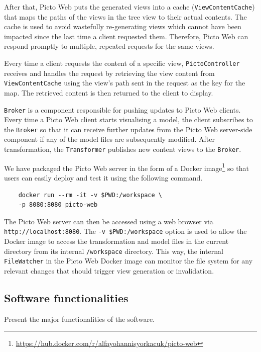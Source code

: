 \documentclass[preprint,12pt, a4paper]{elsarticle}
\begin{document}
After that, Picto Web puts the generated views into a cache (\texttt{ViewContentCache}) that maps the paths of the views in the tree view to their actual contents. The cache is used to avoid wastefully re-generating views which cannot have been impacted since the last time a client requested them. Therefore, Picto Web can respond promptly to multiple, repeated requests for the same views. 

Every time a client requests the content of a specific view, \texttt{Picto\-Control\-ler} receives and handles the request by retrieving the view content from \texttt{ViewContentCache} using the view's path sent in the request as the key for the map. The retrieved content is then returned to the client to display.

\texttt{Broker} is a component responsible for pushing updates to Picto Web clients. Every time a Picto Web client starts visualising a model, the client subscribes to the \texttt{Broker} so that it can receive further updates from the Picto Web server-side component if any of the model files are subsequently modified. After transformation, the \texttt{Transformer} publishes new content views to the \texttt{Broker}.

We have packaged the Picto Web server in the form of a Docker image\footnote{\url{https://hub.docker.com/r/alfayohannisyorkacuk/picto-web}} so that users can easily deploy and test it using the following command. 
\begin{verbatim}
	docker run --rm -it -v $PWD:/workspace \
	-p 8080:8080 picto-web
\end{verbatim}
The Picto Web server can then be accessed using a web browser via \texttt{http://localhost:8080}. 
The \texttt{-v \$PWD:/workspace} option is used to allow the Docker image to access the transformation and model files in the current directory from its internal \texttt{/workspace} directory. 
This way, the internal \texttt{FileWatcher} in the Picto Web Docker image can monitor the file system for any relevant changes that should trigger view generation or invalidation.

\subsection{Software functionalities}

Present the major functionalities of the software.
\end{document}
